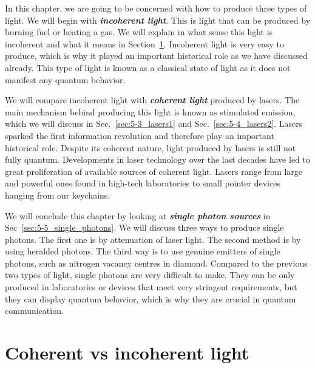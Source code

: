 In this chapter, we are going to be concerned with how to produce three types of light.
We will begin with \textit{\textbf{incoherent light}}.
This is light that can be produced by burning fuel or heating a gas.
We will explain in what sense this light is incoherent and what it means in Section~\ref{sec:5-2_coherent_vs_incoherent}.
Incoherent light is very easy to produce, which is why it played an important historical role as we have discussed already.
This type of light is known as a classical state of light as it does not manifest any quantum behavior.

We will compare incoherent light with \textit{\textbf{coherent light}} produced by lasers. The main mechanism behind producing this light is known as stimulated emission, which we will discuss in Sec.~\ref{sec:5-3_lasers1} and Sec.~\ref{sec:5-4_lasers2}.
Lasers sparked the first information revolution and therefore play an important historical role.
Despite its coherent nature, light produced by lasers is still not fully quantum. 
Developments in laser technology over the last decades have led to great proliferation of available sources of coherent light.
Lasers range from large and powerful ones found in high-tech laboratories to small pointer devices hanging from our keychains.

We will conclude this chapter by looking at \textit{\textbf{single photon sources}} in Sec~\ref{sec:5-5_single_photons}.
We will discuss three ways to produce single photons.
The first one is by attenuation of laser light.
The second method is by using heralded photons.
The third way is to use genuine emitters of single photons, such as nitrogen vacancy centres in diamond.
Compared to the previous two types of light, single photons are very difficult to make.
They can be only produced in laboratories or devices that meet very stringent requirements, but they can display quantum behavior, which is why they are crucial in quantum communication.


\section{Coherent vs incoherent light}
\label{sec:5-2_coherent_vs_incoherent}

